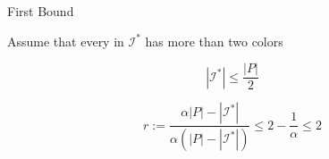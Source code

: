 \begin{frame}{First Bound}

Assume that every \pack{} in $\mathcal{I}^*$ has more than two colors


\pause
\begin{observation}
$$ |\mathcal{I}^*| \leq \frac{|P|}{2} $$
\end{observation}

\pause
\begin{corollary}
$$
r 													:= 
\frac{\alpha |P| - |\mathcal{I}^*|}{\alpha (|P| - |\mathcal{I}^*|)} 	\leq 
2 - \frac{1}{\alpha} 								\leq 
2
$$
\end{corollary}


\end{frame}

